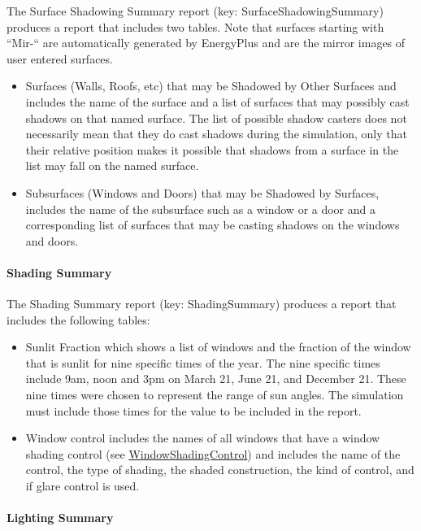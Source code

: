 The Surface Shadowing Summary report (key: SurfaceShadowingSummary) produces a report that includes two tables. Note that surfaces starting with ``Mir-`` are automatically generated by EnergyPlus and are the mirror images of user entered surfaces.

\begin{itemize}
\item
  Surfaces (Walls, Roofs, etc) that may be Shadowed by Other Surfaces and includes the name of the surface and a list of surfaces that may possibly cast shadows on that named surface. The list of possible shadow casters does not necessarily mean that they do cast shadows during the simulation, only that their relative position makes it possible that shadows from a surface in the list may fall on the named surface.
\item
  Subsurfaces (Windows and Doors) that may be Shadowed by Surfaces, includes the name of the subsurface such as a window or a door and a corresponding list of surfaces that may be casting shadows on the windows and doors.
\end{itemize}

\paragraph{Shading Summary}\label{shading-summary}

The Shading Summary report (key: ShadingSummary) produces a report that includes the following tables:

\begin{itemize}
\item
  Sunlit Fraction which shows a list of windows and the fraction of the window that is sunlit for nine specific times of the year. The nine specific times include 9am, noon and 3pm on March 21, June 21, and December 21. These nine times were chosen to represent the range of sun angles. The simulation must include those times for the value to be included in the report.
\item
  Window control includes the names of all windows that have a window shading control (see \hyperref[windowpropertyshadingcontrol]{WindowShadingControl}) and includes the name of the control, the type of shading, the shaded construction, the kind of control, and if glare control is used.
\end{itemize}

\paragraph{Lighting Summary}\label{lighting-summary}

